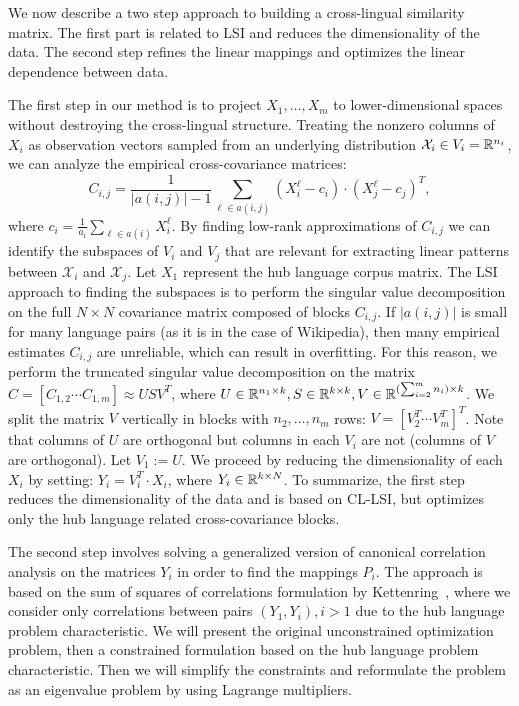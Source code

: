 We now describe a two step approach to building a cross-lingual similarity matrix. 
The first part is related to LSI and reduces the dimensionality of the data. The second 
step refines the linear mappings and optimizes the linear dependence between data.

The first step in our method is to project $X_1, \ldots, X_m$ to lower-dimensional spaces 
without destroying the cross-lingual structure. Treating the nonzero columns of $X_i$ as 
observation vectors sampled from an underlying distribution $\mathcal{X}_i \in V_i = \mathbb{R}^{n_i}$, 
we can analyze the empirical cross-covariance matrices: 
$$C_{i,j} = \frac{1}{|a(i,j)|-1 }\sum_{\ell \in a(i,j)} (X_i^{\ell} - c_i)\cdot (X_j^{\ell} - c_j)^T,$$
where $c_i = \frac{1}{a_i} \sum_{\ell \in a(i)}X_i^{\ell}$. By finding low-rank 
approximations of $C_{i,j}$ we can identify the subspaces of $V_i$ and $V_j$ that are 
relevant for extracting linear patterns between $\mathcal{X}_i$ and $\mathcal{X}_j$. 
Let $X_1$ represent the hub language corpus matrix. The LSI approach to finding the subspaces 
is to perform the singular value decomposition on the full $N \times N$ covariance matrix 
composed of blocks $C_{i,j}$. If $|a(i,j)|$ is small for many language pairs (as it is in the 
case of Wikipedia), then many empirical estimates $C_{i,j}$ are unreliable, which can result 
in overfitting. For this reason, we perform the truncated singular value decomposition on the 
matrix $C = [C_{1,2}  \cdots  C_{1,m}] \approx U S V^T$, where 
$U \in \mathbb{R}^{n_1 \times k}, S \in \mathbb{R}^{k \times k}, V \in \mathbb{R}^{(\sum_{i=2}^m n_i) \times k}$. 
We split the matrix $V$ vertically in blocks with 
$n_2, \ldots, n_m$ rows: $V = [V_2^T  \cdots  V_m^T]^T$. 
Note that columns of $U$ are orthogonal but columns in each $V_i$ are not (columns of $V$ 
are orthogonal). Let $V_1 := U$. We proceed by reducing the dimensionality of each $X_i$ by 
setting: $Y_i = V_i^T \cdot X_i$, where $Y_i \in \mathbb{R}^{k\times N}$. To summarize, the first step 
reduces the dimensionality of the data and is based on CL-LSI, but optimizes only the hub language 
related cross-covariance blocks.

The second step involves solving a generalized version of canonical correlation analysis on the 
matrices $Y_i$ in order to find the mappings $P_i$. The approach is based on the sum of 
squares of correlations formulation by Kettenring~\cite{Kettenring}, where we consider only 
correlations between pairs $(Y_1, Y_i), i >1$ due to the hub language problem characteristic.
We will present the original unconstrained optimization problem, then a constrained formulation 
based on the hub language problem characteristic. Then we will simplify the constraints and 
reformulate the problem as an eigenvalue problem by using Lagrange multipliers.

